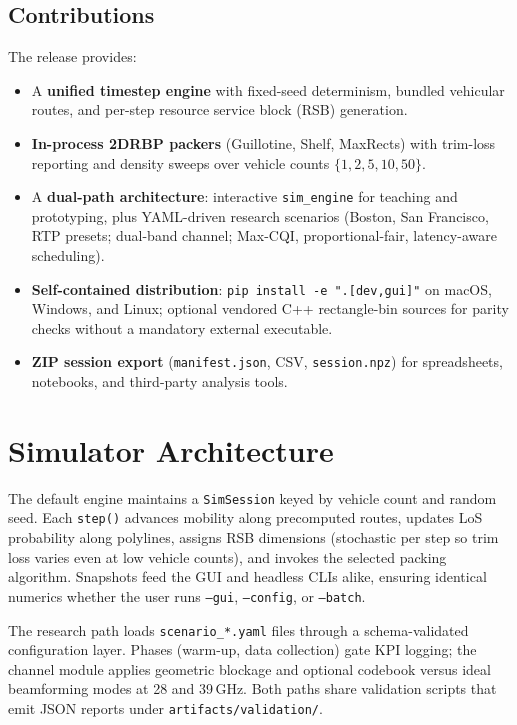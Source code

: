 \documentclass[conference]{IEEEtran}
\begin{document}
\subsection{Contributions}
The release provides:
\begin{itemize}
  \item A \textbf{unified timestep engine} with fixed-seed determinism, bundled vehicular routes, and per-step resource service block (RSB) generation.
  \item \textbf{In-process 2DRBP packers} (Guillotine, Shelf, MaxRects) with trim-loss reporting and density sweeps over vehicle counts $\{1,2,5,10,50\}$.
  \item A \textbf{dual-path architecture}: interactive \texttt{sim\_engine} for teaching and prototyping, plus YAML-driven research scenarios (Boston, San Francisco, RTP presets; dual-band channel; Max-CQI, proportional-fair, latency-aware scheduling).
  \item \textbf{Self-contained distribution}: \texttt{pip install -e ".[dev,gui]"} on macOS, Windows, and Linux; optional vendored C++ rectangle-bin sources for parity checks without a mandatory external executable.
  \item \textbf{ZIP session export} (\texttt{manifest.json}, CSV, \texttt{session.npz}) for spreadsheets, notebooks, and third-party analysis tools.
\end{itemize}

\section{Simulator Architecture}
The default engine maintains a \texttt{SimSession} keyed by vehicle count and random seed.
Each \texttt{step()} advances mobility along precomputed routes, updates LoS probability along polylines, assigns RSB dimensions (stochastic per step so trim loss varies even at low vehicle counts), and invokes the selected packing algorithm.
Snapshots feed the GUI and headless CLIs alike, ensuring identical numerics whether the user runs \texttt{--gui}, \texttt{--config}, or \texttt{--batch}.

The research path loads \texttt{scenario\_*.yaml} files through a schema-validated configuration layer.
Phases (warm-up, data collection) gate KPI logging; the channel module applies geometric blockage and optional codebook versus ideal beamforming modes at 28 and 39\,GHz.
Both paths share validation scripts that emit JSON reports under \texttt{artifacts/validation/}.
\end{document}
